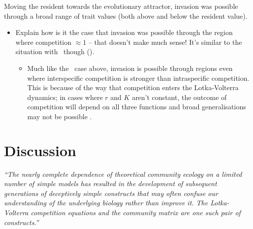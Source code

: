 \documentclass[a4paper,11pt]{article}
\begin{document}
Moving the resident towards the evolutionary attractor, invasion was possible through a broad range of trait values (both above and below the resident value).
\begin{itemize}
\item Explain how is it the case that invasion was possible through the
  region where competition $\approx 1$ -- that doesn't make much sense!
  It's similar to the situation with \hmat\ though (\TODO).
  \begin{itemize}
  \item Much like the \hmat\ case above, invasion is possible through
    regions even where interspecific competition is stronger than
    intraspecific competition.
This is because of the way that
    competition enters the Lotka-Volterra dynamics; in cases where $r$
    and $K$ aren't constant, the outcome of competition will depend on
    all three functions and broad generalisations may not be possible
    \citep[c.f.][]{Leimar-2013}.
  \end{itemize}
\end{itemize}


\section{Discussion}


\emph{``The nearly complete dependence of theoretical community ecology on a limited number of simple models has resulted in the development of subsequent generations of deceptively simple constructs that may often confuse our understanding of the underlying biology rather than improve it. The
Lotka-Volterra competition equations and the community matrix are one such pair of constructs.''} \citep{Neill-1974}
\end{document}
